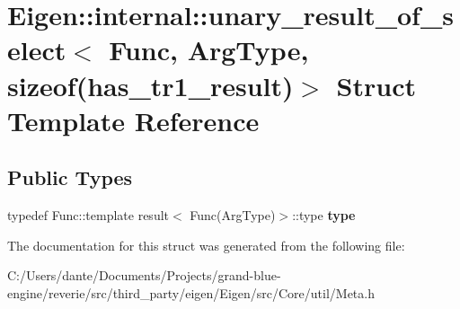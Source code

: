 \hypertarget{struct_eigen_1_1internal_1_1unary__result__of__select_3_01_func_00_01_arg_type_00_01sizeof_07has__tr1__result_08_4}{}\section{Eigen\+::internal\+::unary\+\_\+result\+\_\+of\+\_\+select$<$ Func, Arg\+Type, sizeof(has\+\_\+tr1\+\_\+result)$>$ Struct Template Reference}
\label{struct_eigen_1_1internal_1_1unary__result__of__select_3_01_func_00_01_arg_type_00_01sizeof_07has__tr1__result_08_4}
\subsection*{Public Types}
\begin{DoxyCompactItemize}
\item 
\mbox{\label{struct_eigen_1_1internal_1_1unary__result__of__select_3_01_func_00_01_arg_type_00_01sizeof_07has__tr1__result_08_4_a4c6d5d3db086d2eefd6b334debc16216}} 
typedef Func\+::template result$<$ Func(Arg\+Type)$>$\+::type {\bfseries type}
\end{DoxyCompactItemize}


The documentation for this struct was generated from the following file\+:\begin{DoxyCompactItemize}
\item 
C\+:/\+Users/dante/\+Documents/\+Projects/grand-\/blue-\/engine/reverie/src/third\+\_\+party/eigen/\+Eigen/src/\+Core/util/Meta.\+h\end{DoxyCompactItemize}
